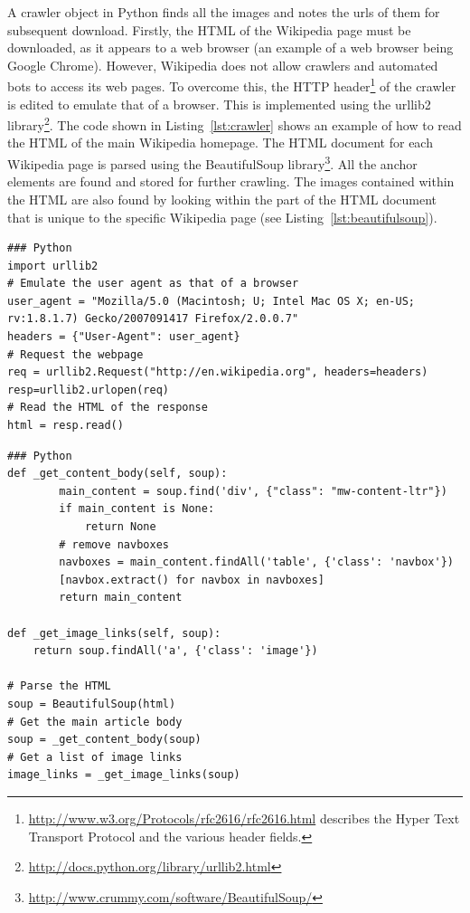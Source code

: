 \documentclass[11pt, onecolumn, a4paper, final]{report} %
\begin{document}
A crawler object in Python finds all the images and notes the urls of them for subsequent download. Firstly, the HTML of the Wikipedia page must be downloaded, as it appears to a web browser (an example of a web browser being Google Chrome). However, Wikipedia does not allow crawlers and automated bots to access its web pages. To overcome this, the HTTP header\footnote{\url{http://www.w3.org/Protocols/rfc2616/rfc2616.html} describes the Hyper Text Transport Protocol and the various header fields.} of the crawler is edited to emulate that of a browser. This is implemented using the urllib2 library\footnote{\url{http://docs.python.org/library/urllib2.html}}. The code shown in Listing~\ref{lst:crawler} shows an example of how to read the HTML of the main Wikipedia homepage. The HTML document for each Wikipedia page is parsed using the BeautifulSoup library\footnote{\url{http://www.crummy.com/software/BeautifulSoup/}}. All the anchor elements are found and stored for further crawling. The images contained within the HTML are also found by looking within the part of the HTML document that is unique to the specific Wikipedia page (see Listing~\ref{lst:beautifulsoup}).

\lstset{language=Python,caption=The code used to gain access to Wikipedia's content using a crawler by emulating a browser.,label=lst:crawler}
\begin{lstlisting}
### Python
import urllib2
# Emulate the user agent as that of a browser
user_agent = "Mozilla/5.0 (Macintosh; U; Intel Mac OS X; en-US; rv:1.8.1.7) Gecko/2007091417 Firefox/2.0.0.7"
headers = {"User-Agent": user_agent}
# Request the webpage
req = urllib2.Request("http://en.wikipedia.org", headers=headers)
resp=urllib2.urlopen(req)
# Read the HTML of the response
html = resp.read()
\end{lstlisting}


\lstset{language=Python,caption=Parsing the Wikipedia article HTML document to find the relevent images.,label=lst:beautifulsoup}
\begin{lstlisting}
### Python
def _get_content_body(self, soup):
        main_content = soup.find('div', {"class": "mw-content-ltr"})
        if main_content is None:
            return None
        # remove navboxes
        navboxes = main_content.findAll('table', {'class': 'navbox'})
        [navbox.extract() for navbox in navboxes]
        return main_content

def _get_image_links(self, soup):
	return soup.findAll('a', {'class': 'image'})
	
# Parse the HTML
soup = BeautifulSoup(html)
# Get the main article body
soup = _get_content_body(soup)
# Get a list of image links
image_links = _get_image_links(soup)
\end{lstlisting}
\end{document}
